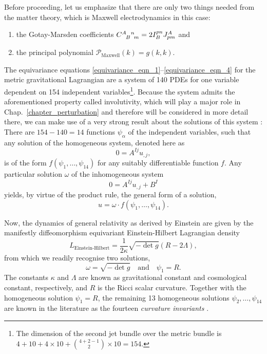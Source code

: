Before proceeding, let us emphasize that there are only two things needed from the matter theory, which is Maxwell electrodynamics in this case:
\begin{enumerate}
  \item the Gotay-Marsden coefficients $\gmc{A}{B}{n}{m} = 2 I_B^{pn} J^A_{pm}$ and
  \item the principal polynomial $\mathcal P_\text{Maxwell}(k) = g(k,k)$.
\end{enumerate}

The equivariance equations \eqref{equivariance_eqn_1}--\eqref{equivariance_eqn_4} for the metric gravitational Lagrangian are a system of 140 PDEs for one variable dependent on 154 independent variables\footnote{The dimension of the second jet bundle over the metric bundle is $4+10+4\times 10 + \binom{4 + 2 - 1}{2}\times 10=154$.}. Because the system admits the aforementioned property called involutivity, which will play a major role in Chap.\ \ref{chapter_perturbation} and therefore will be considered in more detail there, we can make use of a very strong result about the solutions of this system \cite{Seiler_2010}: There are $154-140=14$ functions $\psi_\alpha$ of the independent variables, such that any solution of the homogeneous system, denoted here as
\begin{equation}
  0 = A^{Ij} u_{,j},
\end{equation}
is of the form $f(\psi_1,\dots,\psi_{14})$ for any suitably differentiable function $f$. Any particular solution $\omega$ of the inhomogeneous system
\begin{equation}
  0 = A^{Ij} u_{,j} + B^I
\end{equation}
yields, by virtue of the product rule, the general form of a solution,
\begin{equation}\label{general_metric_solution}
  u = \omega\cdot f(\psi_1,\dots,\psi_{14}).
\end{equation}

Now, the dynamics of general relativity as derived by Einstein are given by the manifestly diffeomorphism equivariant Einstein-Hilbert Lagrangian density
\begin{equation}\label{einstein_hilbert}
  L_\text{Einstein-Hilbert} = \frac{1}{2\kappa} \sqrt{-\operatorname{det}g}(R - 2\Lambda),
\end{equation}
from which we readily recognise two solutions,
\begin{equation}
  \omega = \sqrt{-\operatorname{det}g}\quad\text{and}\quad \psi_1 = R.
\end{equation}
The constants $\kappa$ and $\Lambda$ are known as gravitational constant and cosmological constant, respectively, and $R$ is the Ricci scalar curvature. Together with the homogeneous solution $\psi_1=R$, the remaining 13 homogeneous solutions $\psi_2,\dots,\psi_{14}$ are known in the literature as the fourteen \emph{curvature invariants} \cite{Narlikar_1949,Zakhary_1997}.

